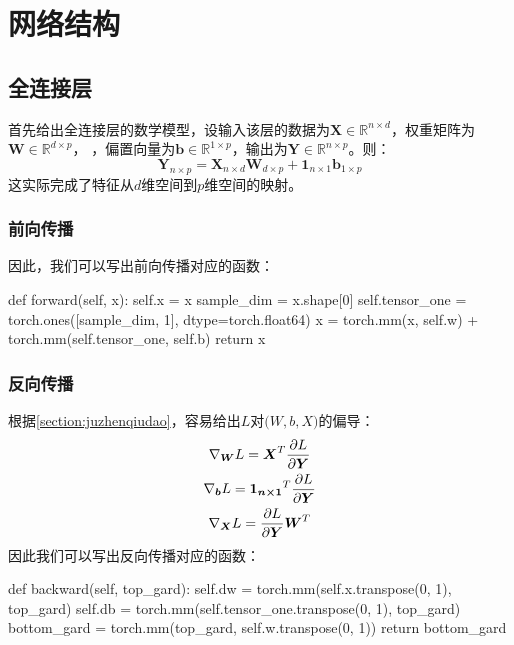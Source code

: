 \documentclass[12pt,a4paper]{ctexart}
\numberwithin{equation}{section}%
\numberwithin{figure}{section}%
\begin{document}
\section{网络结构}
\subsection{全连接层}
首先给出全连接层的数学模型，设输入该层的数据为$\boldsymbol{X} \in  \mathbb{R}^{n \times d}$，权重矩阵为$\boldsymbol{W} \in  \mathbb{R}^{ d \times p }$，
，偏置向量为$\boldsymbol{b} \in \mathbb{R}^{1 \times p} $，输出为$ \boldsymbol{Y} \in \mathbb{R}^{n \times p}$。则：
\begin{equation}
\boldsymbol{Y}_{n \times p}=\boldsymbol{X}_{n \times d}\boldsymbol{W}_{d \times p}+\boldsymbol{1}_{n \times 1}\boldsymbol{b}_{1 \times p}
\end{equation}
这实际完成了特征从$d$维空间到$p$维空间的映射。
\subsubsection{前向传播}
因此，我们可以写出前向传播对应的函数：
\begin{python}
def forward(self, x):
    self.x = x
    sample_dim = x.shape[0]
    self.tensor_one = torch.ones([sample_dim, 1], dtype=torch.float64)
    x = torch.mm(x, self.w) + torch.mm(self.tensor_one, self.b)
    return x
\end{python}
\subsubsection{反向传播}
根据\ref{section:juzhenqiudao}，容易给出$L$对$\boldsymbol(W,b,X)$的偏导：
\begin{gather}
    \nabla_{\boldsymbol{W}} L= \boldsymbol{X}^T \frac{\partial{L}}{\partial{\boldsymbol{Y}}} \notag \\
    \nabla_{\boldsymbol{b}} L =\boldsymbol{1_{n \times 1}}^T \frac{\partial{L}}{\partial{\boldsymbol{Y}}} \notag \\
    \nabla_{\boldsymbol{X}} L =\frac{\partial{L}}{\partial{\boldsymbol{Y}}} \boldsymbol{W}^T 
\end{gather}
因此我们可以写出反向传播对应的函数：
\begin{python}
def backward(self, top_gard):
    self.dw = torch.mm(self.x.transpose(0, 1), top_gard)
    self.db = torch.mm(self.tensor_one.transpose(0, 1), top_gard)
    bottom_gard = torch.mm(top_gard, self.w.transpose(0, 1))
    return bottom_gard
\end{python}
\end{document}
